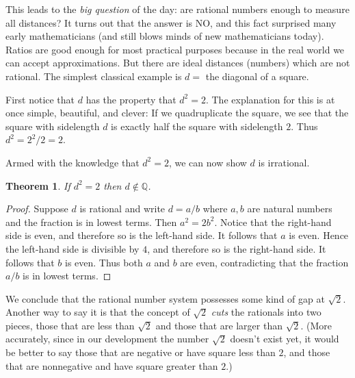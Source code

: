 \documentclass[11pt,oneside]{amsbook}
\newcommand{\Q}{\mathbb Q}
\theoremstyle{definition}
\theoremstyle{plain}
\newtheorem{theorem}{Theorem}[section]
\theoremstyle{definition}
\theoremstyle{remark}
\numberwithin{equation}{section}
\numberwithin{figure}{section}
\begin{document}
This leads to the \emph{big question} of the day: are rational numbers enough to measure all distances? It turns out that the answer is NO, and this fact surprised many early mathematicians (and still blows minds of new mathematicians today). Ratios are good enough for most practical purposes because in the real world we can accept approximations. But there are ideal distances (numbers) which are not rational. The simplest classical example is $d=$ the diagonal of a square.

First notice that $d$ has the property that $d^2=2$. The explanation for this is at once simple, beautiful, and clever: If we quadruplicate the square, we see that the square with sidelength $d$ is exactly half the square with sidelength $2$. Thus $d^2=2^2/2=2$.

\begin{center}
\quad
{}
\end{center}

Armed with the knowledge that $d^2=2$, we can now show $d$ is irrational.

\begin{theorem}
  \label{thm:root-2-irrational}
  If $d^2=2$ then $d\notin\Q$.
\end{theorem}

\begin{proof}
  Suppose $d$ is rational and write $d=a/b$ where $a,b$ are natural numbers and the fraction is in lowest terms. Then $a^2=2b^2$. Notice that the right-hand side is even, and therefore so is the left-hand side. It follows that $a$ is even. Hence the left-hand side is divisible by $4$, and therefore so is the right-hand side. It follows that $b$ is even. Thus both $a$ and $b$ are even, contradicting that the fraction $a/b$ is in lowest terms.
\end{proof}

We conclude that the rational number system possesses some kind of gap at $\sqrt2$. Another way to say it is that the concept of $\sqrt2$ \emph{cuts} the rationals into two pieces, those that are less than $\sqrt2$ and those that are larger than $\sqrt{2}$. (More accurately, since in our development the number $\sqrt{2}$ doesn't exist yet, it would be better to say those that are negative or have square less than $2$, and those that are nonnegative and have square greater than $2$.)
\end{document}
